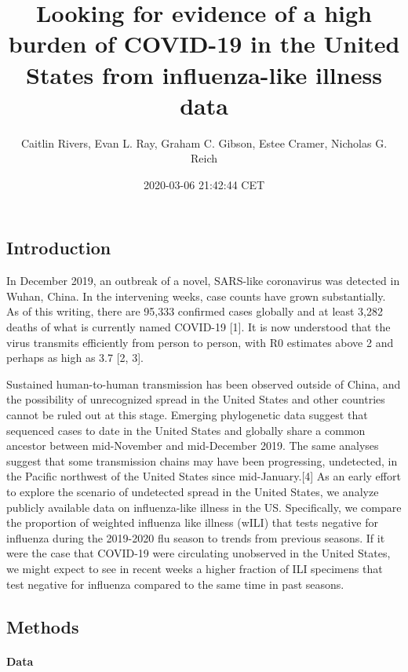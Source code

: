 \documentclass[]{article}
\title{Looking for evidence of a high burden of COVID-19 in the United States
from influenza-like illness data}
\author{Caitlin Rivers, Evan L. Ray, Graham C. Gibson, Estee Cramer, Nicholas G.
Reich}
\date{2020-03-06 21:42:44 CET}
\let\oldparagraph\paragraph
\renewcommand{\paragraph}[1]{\oldparagraph{#1}\mbox{}}
\begin{document}
\maketitle

\hypertarget{introduction}{%
\subsection{Introduction}\label{introduction}}

In December 2019, an outbreak of a novel, SARS-like coronavirus was
detected in Wuhan, China. In the intervening weeks, case counts have
grown substantially. As of this writing, there are 95,333 confirmed
cases globally and at least 3,282 deaths of what is currently named
COVID-19 {[}1{]}. It is now understood that the virus transmits
efficiently from person to person, with R0 estimates above 2 and perhaps
as high as 3.7 {[}2, 3{]}.

Sustained human-to-human transmission has been observed outside of
China, and the possibility of unrecognized spread in the United States
and other countries cannot be ruled out at this stage. Emerging
phylogenetic data suggest that sequenced cases to date in the United
States and globally share a common ancestor between mid-November and
mid-December 2019. The same analyses suggest that some transmission
chains may have been progressing, undetected, in the Pacific northwest
of the United States since mid-January.{[}4{]} As an early effort to
explore the scenario of undetected spread in the United States, we
analyze publicly available data on influenza-like illness in the US.
Specifically, we compare the proportion of weighted influenza like
illness (wILI) that tests negative for influenza during the 2019-2020
flu season to trends from previous seasons. If it were the case that
COVID-19 were circulating unobserved in the United States, we might
expect to see in recent weeks a higher fraction of ILI specimens that
test negative for influenza compared to the same time in past seasons.

\hypertarget{methods}{%
\subsection{Methods}\label{methods}}

\hypertarget{data}{%
\paragraph{Data}\label{data}}
\end{document}
